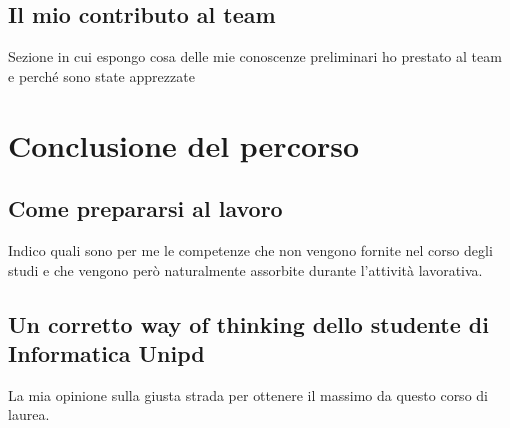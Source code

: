 \subsection{Il mio contributo al team}
Sezione in cui espongo cosa delle mie conoscenze preliminari ho prestato al team e perché sono state apprezzate

\section{Conclusione del percorso}
\subsection{Come prepararsi al lavoro}
Indico quali sono per me le competenze che non vengono fornite nel corso degli studi e che vengono però naturalmente assorbite durante l'attività lavorativa.

\subsection{Un corretto way of thinking dello studente di Informatica Unipd}
La mia opinione sulla giusta strada per ottenere il massimo da questo corso di laurea.

